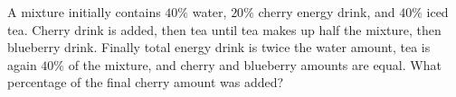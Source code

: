 A mixture initially contains $40\%$ water, $20\%$ cherry energy drink, and $40\%$ iced tea. Cherry drink is added, then tea until tea makes up half the mixture, then blueberry drink. Finally total energy drink is twice the water amount, tea is again $40\%$ of the mixture, and cherry and blueberry amounts are equal. What percentage of the final cherry amount was added?
